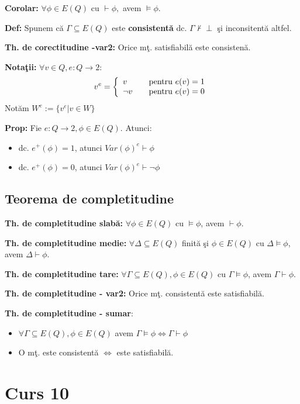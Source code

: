 \documentclass{article}
\begin{document}
\textbf{Corolar:} $\forall \phi\in E(Q)$ cu $\vdash\phi,$ avem $\models\phi$.

\textbf{Def:} Spunem c\u a $\Gamma\subseteq E(Q)$ este \textbf{consistent\u a} dc. $\Gamma\nvdash \perp$ \c si inconsitent\u a altfel.

\textbf{Th. de corectitudine -var2:} Orice m\c t. satisfiabil\u a este consisten\u a.

\textbf{Nota\c tii:} $\forall v\in Q,e:Q\rightarrow 2$:
\[ v^e = \left\{ \begin{array}{l l} v & \quad \text{pentru $e(v)=1$}\\ \neg v & \quad \text{pentru $e(v)=0$}\\ \end{array} \right. \]
Not\u am $W^e:=\{v^e|v\in W\}$

\textbf{Prop:} Fie $e:Q\rightarrow 2, \phi\in E(Q)$. Atunci:
\begin{itemize}
    \item dc. $e^+(\phi)=1$, atunci $Var(\phi)^e\vdash\phi$
    \item dc. $e^+(\phi)=0$, atunci $Var(\phi)^e\vdash\neg\phi$
\end{itemize}

\subsection{Teorema de completitudine}

\textbf{Th. de completitudine slab\u a:} $\forall\phi\in E(Q)$ cu $\models\phi$, avem $\vdash\phi$.

\textbf{Th. de completitudine medie:} $\forall\Delta\subseteq E(Q)$ finit\u a \c si $\phi\in E(Q)$ cu $\Delta\models\phi$, avem $\Delta\vdash\phi$.

\textbf{Th. de completitudine tare:} $\forall\Gamma\subseteq E(Q),\phi\in E(Q)$ cu $\Gamma\models\phi$, avem $\Gamma\vdash\phi$.

\textbf{Th. de completitudine - var2:} Orice m\c t. consistent\u a este satisfiabil\u a.

\textbf{Th. de completitudine - sumar}:
\begin{itemize}
    \item $\forall\Gamma\subseteq E(Q),\phi\in E(Q)$ avem $\Gamma\models\phi\iff \Gamma\vdash\phi$
    \item O m\c t. este consistent\u a $\iff$ este satisfiabil\u a.
\end{itemize}

\section{Curs 10}
\end{document}
